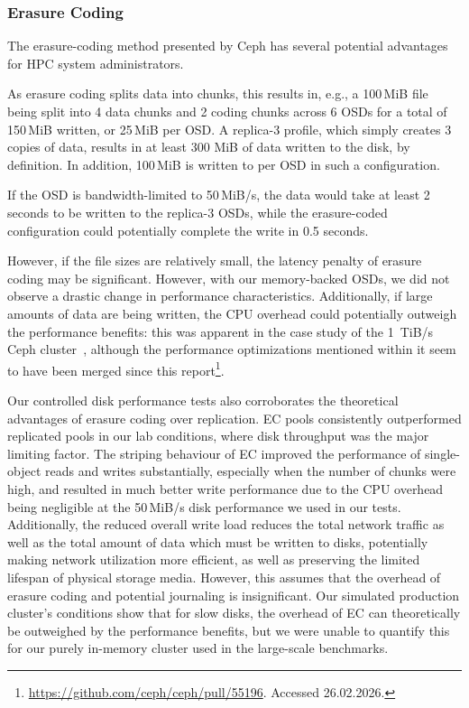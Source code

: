 \subsubsection{Erasure Coding}

The erasure-coding method presented by Ceph has several potential advantages for \ac{HPC} system administrators.

As erasure coding splits data into chunks, this results in, e.g., a 100\,MiB file being split into 4 data chunks and 2 coding chunks across 6 \acp{OSD} for a total of 150\,MiB written, or 25\,MiB per \ac{OSD}. A replica-3 profile, which simply creates 3 copies of data, results in at least 300 MiB of data written to the disk, by definition. In addition, 100\,MiB is written to per \ac{OSD} in such a configuration. 

If the \ac{OSD} is bandwidth-limited to 50\,MiB/s, the data would take at least 2 seconds to be written to the replica-3 \acp{OSD}, while the erasure-coded configuration could potentially complete the write in 0.5 seconds.

However, if the file sizes are relatively small, the latency penalty of erasure coding may be significant. However, with our memory-backed \acp{OSD}, we did not observe a drastic change in performance characteristics. Additionally, if large amounts of data are being written, the \ac{CPU} overhead could potentially outweigh the performance benefits: this was apparent in the case study of the 1\ TiB/s Ceph cluster~\cite{ceph-1tib}, although the performance optimizations mentioned within it seem to have been merged since this report\footnote{\url{https://github.com/ceph/ceph/pull/55196}. Accessed 26.02.2026.}.

Our controlled disk performance tests also corroborates the theoretical advantages of erasure coding over replication. \ac{EC} pools consistently outperformed replicated pools in our lab conditions, where disk throughput was the major limiting factor. The striping behaviour of \ac{EC} improved the performance of single-object reads and writes substantially, especially when the number of chunks were high, and resulted in much better write performance due to the \ac{CPU} overhead being negligible at the 50\,MiB/s disk performance we used in our tests. Additionally, the reduced overall write load reduces the total network traffic as well as the total amount of data which must be written to disks, potentially making network utilization more efficient, as well as preserving the limited lifespan of physical storage media. However, this assumes that the overhead of erasure coding and potential journaling is insignificant. Our simulated production cluster's conditions show that for slow disks, the overhead of \ac{EC} can theoretically be outweighed by the performance benefits, but we were unable to quantify this for our purely in-memory cluster used in the large-scale benchmarks.

